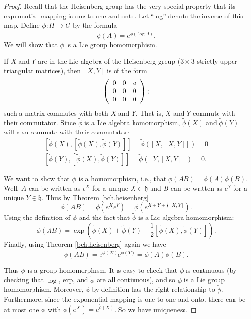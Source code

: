 \documentclass[12pt]{amsbook}
\let \frak = \mathfrak
\theoremstyle{plain}
\numberwithin{equation}{chapter}
\numberwithin{theorem}{chapter}
\begin{document}
\begin{proof}
Recall that the Heisenberg group has the very special property that its
exponential mapping is one-to-one and onto. Let ``log'' denote the inverse of
this map. Define $\phi:H\rightarrow G$ by the formula
\[
\phi\left(  A\right)  =e^{\widetilde{\phi}\left(  \log A\right)  }\text{.}%
\]
We will show that $\phi$ is a Lie group homomorphism.

If $X$ and $Y$ are in the Lie algebra of the Heisenberg group ($3\times3$
strictly upper-triangular matrices), then $\left[  X,Y\right]  $ is of the
form
\[
\left(
\begin{array}
[c]{lll}%
0 & 0 & a\\
0 & 0 & 0\\
0 & 0 & 0
\end{array}
\right)  ;
\]
such a matrix commutes with both $X$ and $Y$. That is, $X$ and $Y$ commute
with their commutator. Since $\widetilde{\phi}$ is a Lie algebra homomorphism,
$\widetilde{\phi}\left(  X\right)  $ and $\widetilde{\phi}\left(  Y\right)  $
will also commute with their commutator:
\begin{align*}
\left[  \widetilde{\phi}\left(  X\right)  ,\left[  \widetilde{\phi}\left(
X\right)  ,\widetilde{\phi}\left(  Y\right)  \right]  \right]  =\widetilde
{\phi}\left(  \left[  X,\left[  X,Y\right]  \right]  \right)  =0\\
\left[  \widetilde{\phi}\left(  Y\right)  ,\left[  \widetilde{\phi}\left(
X\right)  ,\widetilde{\phi}\left(  Y\right)  \right]  \right]  =\widetilde
{\phi}\left(  \left[  Y,\left[  X,Y\right]  \right]  \right)  =0\text{.}%
\end{align*}

We want to show that $\phi$ is a homomorphism, i.e., that $\phi\left(
AB\right)  =\phi\left(  A\right)  \phi\left(  B\right)  $. Well, $A$ can be
written as $e^{X}$ for a unique $X\in\frak{h}$ and $B$ can be written as
$e^{Y}$ for a unique $Y\in\frak{h}$. Thus by Theorem \ref{bch.heisenberg}
\[
\phi\left(  AB\right)  =\phi\left(  e^{X}e^{Y}\right)  =\phi\left(
e^{X+Y+\frac{1}{2}\left[  X,Y\right]  }\right)  \text{.}%
\]
Using the definition of $\phi$ and the fact that $\widetilde{\phi}$ is a Lie
algebra homomorphism:
\[
\phi\left(  AB\right)  =\exp\left(  \widetilde{\phi}\left(  X\right)
+\widetilde{\phi}\left(  Y\right)  +\frac{1}{2}\left[  \widetilde{\phi}\left(
X\right)  ,\widetilde{\phi}\left(  Y\right)  \right]  \right)  \text{.}%
\]
Finally, using Theorem \ref{bch.heisenberg} again we have
\[
\phi\left(  AB\right)  =e^{\widetilde{\phi}\left(  X\right)  }e^{\widetilde
{\phi}\left(  Y\right)  }=\phi\left(  A\right)  \phi\left(  B\right)  \text{.}%
\]

Thus $\phi$ is a group homomorphism. It is easy to check that $\phi$ is
continuous (by checking that $\log$, exp, and $\widetilde{\phi}$ are all
continuous), and so $\phi$ is a Lie group homomorphism. Moreover, $\phi$ by
definition has the right relationship to $\widetilde{\phi}$. Furthermore,
since the exponential mapping is one-to-one and onto, there can be at most one
$\phi$ with $\phi\left(  e^{X}\right)  =e^{\widetilde{\phi}\left(  X\right)
}$. So we have uniqueness.
\end{proof}
\end{document}
